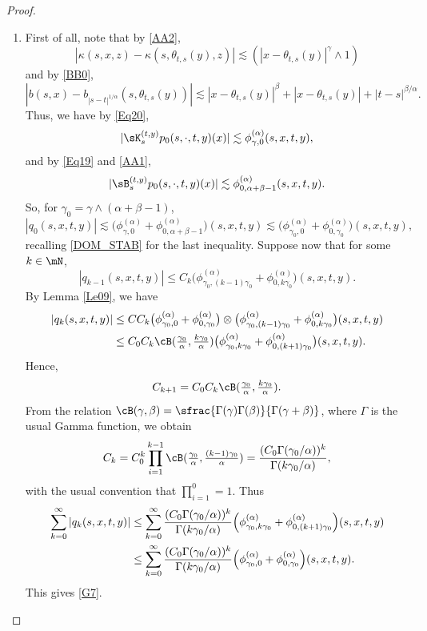 \skpt
\begin{proof}
\begin{enumerate}
\item\label{pf:Le31i}
First of all, note that by \eqref{AA2},
\begin{equation*}
|\kappa(s,x,z)-\kappa(s, \theta_{t,s}(y),z)|\lesssim (|x-\theta_{t,s}(y)|^{\gamma}\wedge 1)
\end{equation*}
and by \eqref{BB0},
\begin{equation*}
|b(s,x)-b_{|s-t|^{1/\alpha}}(s, \theta_{t,s}(y))|
\lesssim |x-\theta_{t,s}(y)|^\beta+|x-\theta_{t,s}(y)|+|t-s|^{\beta/\alpha}.
\end{equation*}
Thus, we have by \eqref{Eq20},
\begin{equation*}
|\sK^{(t,y)}_{s}p_0(s,\cdot,t,y)(x)|\lesssim \phi^{(\alpha)}_{\gamma,0}(s,x,t,y),
\end{equation*}
and by \eqref{Eq19} and \eqref{AA1},
\begin{equation*}
|\sB^{(t,y)}_{s} p_0(s,\cdot,t,y)(x)|\lesssim \phi^{(\alpha)}_{0,\alpha+\beta-1}(s,x,t,y).
\end{equation*}
So, for $\gamma_0=\gamma\wedge(\alpha+\beta-1)$,
\begin{equation*}
|q_0(s,x,t,y)|\lesssim\bigl(\phi^{(\alpha)}_{\gamma,0}+\phi^{(\alpha)}_{0,\alpha+\beta-1}\bigr)(s,x,t,y)
\lesssim\bigl(\phi^{(\alpha)}_{\gamma_0,0}+\phi^{(\alpha)}_{0,\gamma_0}\bigr)(s,x,t,y),
\end{equation*}
{recalling \eqref{DOM_STAB} for the last inequality.}
Suppose now that for some $k\in\mN$,
\[
|q_{k-1}(s,x,t,y)|\leq C_k\bigl(\phi^{(\alpha)}_{\gamma_0,(k-1)\gamma_0}+\phi^{(\alpha)}_{0,k\gamma_0}\bigr)(s,x,t,y).
\]
By Lemma \ref{Le09}, we have
\begin{align*}
|q_{k}(s,x,t,y)|
&\leq C C_k\bigl(\phi^{(\alpha)}_{\gamma_0,0}+\phi^{(\alpha)}_{0,\gamma_0}\bigr)\otimes
\bigl(\phi^{(\alpha)}_{\gamma_0,(k-1)\gamma_0}+\phi^{(\alpha)}_{0,k\gamma_0}\bigr)(s,x,t,y)
\\
&\leq C_0C_k\cB(\tfrac{\gamma_0}{\alpha},\tfrac{k\gamma_0}{\alpha})
\bigl(\phi^{(\alpha)}_{\gamma_0,k\gamma_0}+\phi^{(\alpha)}_{0,(k+1)\gamma_0}\bigr)(s,x,t,y).%
\end{align*}
Hence,
\[
C_{k+1}=C_0C_k\cB(\tfrac{\gamma_0}{\alpha},\tfrac{k\gamma_0}{\alpha}).
\]
From the relation $\cB(\gamma,\beta)=\sfrac{\Gamma(\gamma)\Gamma(\beta)}{\Gamma(\gamma+\beta)}$, where $\Gamma$
is the usual Gamma function, we obtain
\[
C_k=C^k_0\prod_{i=1}^{k-1}\cB(\tfrac{\gamma_0}{\alpha},\tfrac{(k-1)\gamma_0}{\alpha})
=\frac{(C_0\Gamma(\gamma_0/\alpha))^k}{\Gamma(k\gamma_0/\alpha)},
\]
with the usual convention that $\prod_{i=1}^{0}=1 $.
Thus
\begin{align*}
\sum_{k=0}^\infty |q_k(s,x,t,y)|
&\leq \sum_{k=0}^\infty\frac{(C_0\Gamma(\gamma_0/\alpha))^k}{\Gamma(k\gamma_0/\alpha)}
\Bigl(\phi^{(\alpha)}_{\gamma_0,k\gamma_0}+\phi^{(\alpha)}_{0,(k+1)\gamma_0}\Bigr)(s,x,t,y)
\\&\leq \sum_{k=0}^\infty\frac{(C_0\Gamma(\gamma_0/\alpha))^k}{\Gamma(k\gamma_0/\alpha)}
\Bigl(\phi^{(\alpha)}_{\gamma_0,0}+\phi^{(\alpha)}_{0,\gamma_0}\Bigr)(s,x,t,y).
\end{align*}
This gives \eqref{G7}.


\end{enumerate}
\end{proof}
